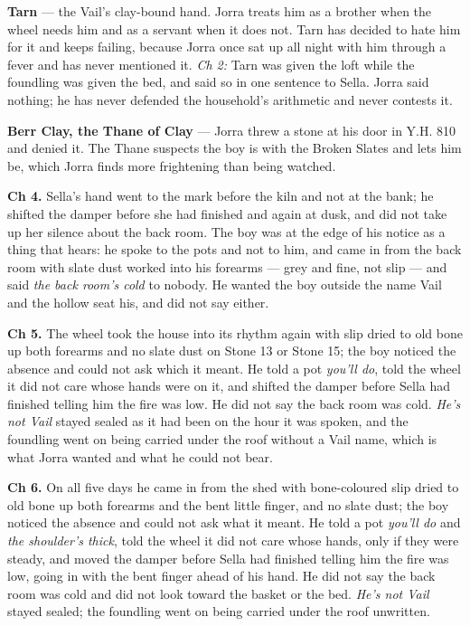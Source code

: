 \documentclass{design/chronicle}
\begin{document}
{\textbf{Tarn} — the Vail’s clay-bound hand. Jorra treats him as a brother when the wheel needs him and as a servant when it does not. Tarn has decided to hate him for it and keeps failing, because Jorra once sat up all night with him through a fever and has never mentioned it. \emph{Ch 2:} Tarn was given the loft while the foundling was given the bed, and said so in one sentence to Sella. Jorra said nothing; he has never defended the household’s arithmetic and never contests it.

\textbf{Berr Clay, the Thane of Clay} — Jorra threw a stone at his door in Y.H. 810 and denied it. The Thane suspects the boy is with the Broken Slates and lets him be, which Jorra finds more frightening than being watched.

\textbf{Ch 4.} Sella’s hand went to the mark before the kiln and not at the bank; he shifted the damper before she had finished and again at dusk, and did not take up her silence about the back room. The boy was at the edge of his notice as a thing that hears: he spoke to the pots and not to him, and came in from the back room with slate dust worked into his forearms --- grey and fine, not slip --- and said \emph{the back room’s cold} to nobody. He wanted the boy outside the name Vail and the hollow seat his, and did not say either.

\textbf{Ch 5.} The wheel took the house into its rhythm again with slip dried to old bone up both forearms and no slate dust on Stone 13 or Stone 15; the boy noticed the absence and could not ask which it meant. He told a pot \emph{you’ll do}, told the wheel it did not care whose hands were on it, and shifted the damper before Sella had finished telling him the fire was low. He did not say the back room was cold. \emph{He’s not Vail} stayed sealed as it had been on the hour it was spoken, and the foundling went on being carried under the roof without a Vail name, which is what Jorra wanted and what he could not bear.

\textbf{Ch 6.} On all five days he came in from the shed with bone-coloured slip dried to old bone up both forearms and the bent little finger, and no slate dust; the boy noticed the absence and could not ask what it meant. He told a pot \emph{you’ll do} and \emph{the shoulder’s thick}, told the wheel it did not care whose hands, only if they were steady, and moved the damper before Sella had finished telling him the fire was low, going in with the bent finger ahead of his hand. He did not say the back room was cold and did not look toward the basket or the bed. \emph{He’s not Vail} stayed sealed; the foundling went on being carried under the roof unwritten.

}
\end{document}
